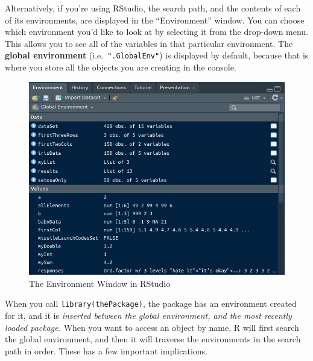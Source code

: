 \documentclass[
  12pt,
  krantz2]{krantz}
\begin{document}
Alternatively, if you're using RStudio, the search path, and the contents of each of its environments, are displayed in the ``Environment'' window. You can choose which environment you'd like to look at by selecting it from the drop-down menu. This allows you to see all of the variables in that particular environment. The \textbf{global environment} (i.e.~\texttt{".GlobalEnv"}) is displayed by default, because that is where you store all the objects you are creating in the console.

\begin{figure}

{\centering \includegraphics[width=0.8\linewidth]{pics/environments_display_rstudio} 

}

\caption{The Environment Window in RStudio}\label{fig:rstudiodisp}
\end{figure}

When you call \texttt{library(thePackage)}, the package has an environment created for it, and it is \emph{inserted between the global environment, and the most recently loaded package.} When you want to access an object by name, R will first search the global environment, and then it will traverse the environments in the search path in order. These has a few important implications.
\end{document}
